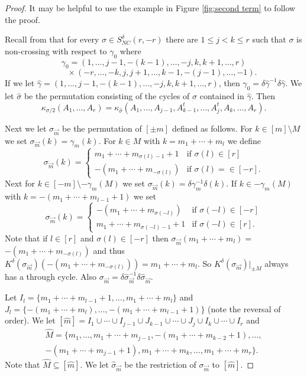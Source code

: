 \documentclass[11pt]{amsart}
\theoremstyle{definition}
\numberwithin{theorem}{section}
\newcommand{\NC}{\mathit{NC}}
\newcommand{\vm}{{\vec{m}}}
\newcommand{\sz}{{\scriptscriptstyle0}}
\newcommand{\ab}{\allowbreak}
\begin{document}
\begin{proof}
It may be helpful to use the example in Figure
\ref{fig:second term} to follow the proof.

Recall from \cite[Lemma 24]{mvb} that for every $\sigma \in
S_\NC^\delta(r, -r)$ there are $1 \leq j < k \leq r$ such
that $\sigma$ is non-crossing with respect to $\gamma_\sz$
where
\[
\gamma_\sz
= (1, \dots, j-1, -(k-1), \dots, -j, k, k+1, \dots, r)
\]
\[
\qquad\mbox{}\times
(-r, \dots, -k, j, j+1, \dots, k-1, -(j-1), \dots, -1).
\]
If we let $\hat\gamma = (1, \dots, j-1, -(k-1), \dots, -j,
k, k+1, \dots, r)$, then $\gamma_\sz = \delta
\hat\gamma^{-1} \delta \hat\gamma$.  We let $\hat\sigma$ be
the permutation consisting of the cycles of $\sigma$
contained in $\hat\gamma$. Then
\[
\kappa_{\sigma/2}(A_1, \dots, A_r) = 
\kappa_{\hat\sigma}(A_1, \dots, A_{j-1}, A_{k-1}^t, \dots, A_j^t, A_k, \dots, A_r). 
\]

Next we let $\sigma_\vm$ be the permutation of $[\pm m]$
defined as follows. For $k \in [m] \setminus M$ we set
$\sigma_\vm(k) = \gamma_m(k)$. For $k \in M$ with $k = m_1 +
\cdots + m_l$ we define \[ \sigma_\vm(k) =
\begin{cases} 
m_1 + \cdots + m_{\sigma(l) -1 } + 1 & \mbox{if\ } \sigma(l) \in [r] \\
-(m_1 + \cdots + m_{-\sigma(l)}) & \mbox{if\ }  \sigma(l) =\in [-r].
\end{cases}
\]
Next for $k \in [-m]\setminus -\gamma_m(M)$ we set
$\sigma_\vm(k) = \delta\gamma_m^{-1}\delta(k)$. If $k \in
-\gamma_m(M)$ with $k = -(m_1 + \cdots + m_{l-1} +1)$ we set
\[
\sigma_\vm(k) =
\begin{cases} 
-(m_1 + \cdots + m_{\sigma(-l)}) & \mbox{if\ } \sigma(-l) \in [-r] \\
m_1 + \cdots + m_{\sigma(-l)-1}+ 1 & \mbox{if\ }  \sigma(-l) \in [r].
\end{cases}
\]
Note that if $l \in [r]$ and $\sigma(l) \in [-r]$ then
$\sigma_\vm(m_1 + \cdots + m_l) =$ $-(m_1 + \cdots +
m_{-\sigma(l)})$ and thus $K^\delta(\sigma_\vm)(-(m_1 +
\cdots + m_{-\sigma(l)})) = m_1 + \cdots + m_l$. So
$K^\delta(\sigma_\vm)|_{\pm M}$ always has a through
cycle. Also $\sigma_\vm = \delta \hat \sigma_\vm^{-1} \delta
\hat\sigma_\vm$.

Let $I_l = \{ m_1 + \cdots + m_{l-1} +1, \dots, m_1 + \cdots
+ m_l\}$ and $J_l = \{ -(m_1\ab + \cdots +m_l), \dots, -(m_1
+ \cdots + m_{l-1}+1)\}$ (note the reversal of order).  We
let $ [\hat m] = I_1 \cup \cdots \cup I_{j-1} \cup J_{k-1}
\cup \cdots \cup J_j \cup I_k \cup \cdots \cup I_r$ and
\begin{multline*}
\widehat{M}
= \{ m_1, \dots, m_1 + \cdots + m_{j-1}, -(m_1 + \cdots + m_{k-2}+1), 
\dots, \\
-(m_1 + \cdots + m_{j-1} + 1), m_1 + \cdots + m_k, \dots, m_1 + \cdots + m_r\}.
\end{multline*}
Note that $\widehat{M} \subseteq [\hat m]$. We let
$\hat\sigma_\vm$ be the restriction of $\sigma_\vm$ to
$[\hat m]$.


\end{proof}
\end{document}
